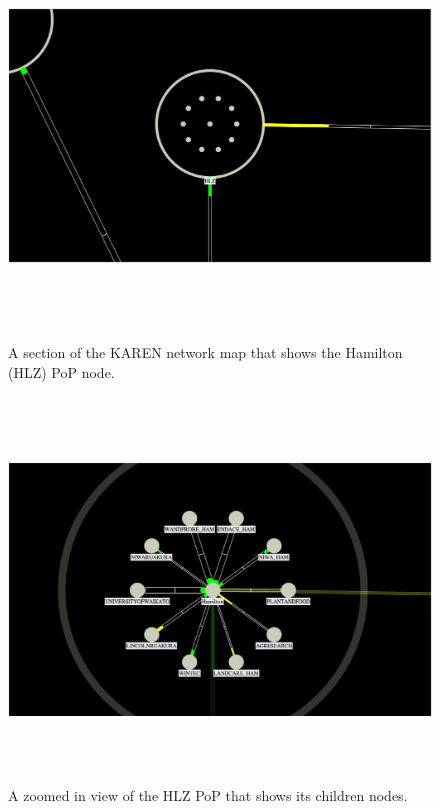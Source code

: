 \documentclass[11pt, a4paper]{article}
\begin{document}
 
\begin{figure}
\centering
\includegraphics[width=170mm,height=107.58mm]{assets/nodes1-0.eps}
\caption{A section of the KAREN network map that shows the Hamilton (HLZ) PoP
node.}
\label{fig:nodes1.0}
\end{figure}

\begin{figure}
\centering
\includegraphics[width=170mm,height=101.93mm]{assets/nodes1-1.eps}
\caption{A zoomed in view of the HLZ PoP that shows its children nodes.}
\label{fig:nodes1.1}
\end{figure}
\end{document}
